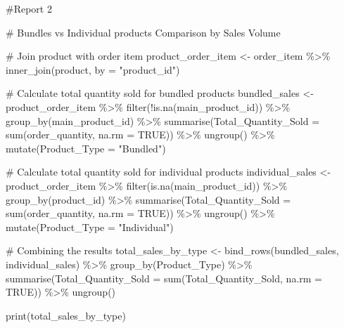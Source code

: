 \documentclass[
  letterpaper,
  DIV=11,
  numbers=noendperiod]{scrartcl}
\newenvironment{Shaded}{\begin{snugshade}}{\end{snugshade}}
\newcommand{\AttributeTok}[1]{\textcolor[rgb]{0.40,0.45,0.13}{#1}}
\newcommand{\CommentTok}[1]{\textcolor[rgb]{0.37,0.37,0.37}{#1}}
\newcommand{\ConstantTok}[1]{\textcolor[rgb]{0.56,0.35,0.01}{#1}}
\newcommand{\FunctionTok}[1]{\textcolor[rgb]{0.28,0.35,0.67}{#1}}
\newcommand{\NormalTok}[1]{\textcolor[rgb]{0.00,0.23,0.31}{#1}}
\newcommand{\OtherTok}[1]{\textcolor[rgb]{0.00,0.23,0.31}{#1}}
\newcommand{\SpecialCharTok}[1]{\textcolor[rgb]{0.37,0.37,0.37}{#1}}
\newcommand{\StringTok}[1]{\textcolor[rgb]{0.13,0.47,0.30}{#1}}
\begin{document}
\begin{Shaded}
\begin{Highlighting}[]
\CommentTok{\#Report 2}

\CommentTok{\# Bundles vs Individual products Comparison by Sales Volume}

\CommentTok{\# Join product with order item }
\NormalTok{product\_order\_item }\OtherTok{\textless{}{-}}\NormalTok{ order\_item }\SpecialCharTok{\%\textgreater{}\%}
  \FunctionTok{inner\_join}\NormalTok{(product, }\AttributeTok{by =} \StringTok{"product\_id"}\NormalTok{)}

\CommentTok{\# Calculate total quantity sold for bundled products}
\NormalTok{bundled\_sales }\OtherTok{\textless{}{-}}\NormalTok{ product\_order\_item }\SpecialCharTok{\%\textgreater{}\%}
  \FunctionTok{filter}\NormalTok{(}\SpecialCharTok{!}\FunctionTok{is.na}\NormalTok{(main\_product\_id)) }\SpecialCharTok{\%\textgreater{}\%}
  \FunctionTok{group\_by}\NormalTok{(main\_product\_id) }\SpecialCharTok{\%\textgreater{}\%}
  \FunctionTok{summarise}\NormalTok{(}\AttributeTok{Total\_Quantity\_Sold =} \FunctionTok{sum}\NormalTok{(order\_quantity, }\AttributeTok{na.rm =} \ConstantTok{TRUE}\NormalTok{)) }\SpecialCharTok{\%\textgreater{}\%}
  \FunctionTok{ungroup}\NormalTok{() }\SpecialCharTok{\%\textgreater{}\%}
  \FunctionTok{mutate}\NormalTok{(}\AttributeTok{Product\_Type =} \StringTok{"Bundled"}\NormalTok{)}

\CommentTok{\# Calculate total quantity sold for individual products}
\NormalTok{individual\_sales }\OtherTok{\textless{}{-}}\NormalTok{ product\_order\_item }\SpecialCharTok{\%\textgreater{}\%}
  \FunctionTok{filter}\NormalTok{(}\FunctionTok{is.na}\NormalTok{(main\_product\_id)) }\SpecialCharTok{\%\textgreater{}\%}
  \FunctionTok{group\_by}\NormalTok{(product\_id) }\SpecialCharTok{\%\textgreater{}\%}
  \FunctionTok{summarise}\NormalTok{(}\AttributeTok{Total\_Quantity\_Sold =} \FunctionTok{sum}\NormalTok{(order\_quantity, }\AttributeTok{na.rm =} \ConstantTok{TRUE}\NormalTok{)) }\SpecialCharTok{\%\textgreater{}\%}
  \FunctionTok{ungroup}\NormalTok{() }\SpecialCharTok{\%\textgreater{}\%}
  \FunctionTok{mutate}\NormalTok{(}\AttributeTok{Product\_Type =} \StringTok{"Individual"}\NormalTok{)}

\CommentTok{\# Combining the results}
\NormalTok{total\_sales\_by\_type }\OtherTok{\textless{}{-}} \FunctionTok{bind\_rows}\NormalTok{(bundled\_sales, individual\_sales) }\SpecialCharTok{\%\textgreater{}\%}
  \FunctionTok{group\_by}\NormalTok{(Product\_Type) }\SpecialCharTok{\%\textgreater{}\%}
  \FunctionTok{summarise}\NormalTok{(}\AttributeTok{Total\_Quantity\_Sold =} \FunctionTok{sum}\NormalTok{(Total\_Quantity\_Sold, }\AttributeTok{na.rm =} \ConstantTok{TRUE}\NormalTok{)) }\SpecialCharTok{\%\textgreater{}\%}
  \FunctionTok{ungroup}\NormalTok{()}

\FunctionTok{print}\NormalTok{(total\_sales\_by\_type)}
\end{Highlighting}
\end{Shaded}
\end{document}
